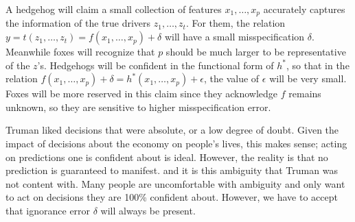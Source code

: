 \documentclass[12pt]{article}
\begin{document}


\begin{enumerate}


A hedgehog will claim a small collection of features $x_1,\ldots,x_p$ accurately captures
the information of the true drivers $z_1,\ldots,z_t$. For them, the relation
$y=t(z_1,\ldots,z_t)=f(x_1,\ldots,x_p)+\delta$ will have a small misspecification $\delta$.
Meanwhile foxes will recognize that $p$ should be much larger to be representative of
the $z$'s. Hedgehogs will be confident in the functional form of $h^*$, so that
in the relation $f(x_1,\ldots,x_p)+\delta=h^*(x_1,\ldots,x_p)+\epsilon$, the value
of $\epsilon$ will be very small. Foxes will be more reserved in this claim since
they acknowledge $f$ remains unknown, so they are sensitive to higher misspecification error.


Truman liked decisions that were absolute, or a low degree of doubt. Given the impact
of decisions about the economy on people's lives, this makes sense; acting on predictions
one is confident about is ideal. However, the reality is that no prediction is guaranteed
to manifest. and it is this ambiguity that Truman was not content with. Many people
are uncomfortable with ambiguity and only want to act on decisions they are 100\% confident
about. However, we have to accept that ignorance error $\delta$ will always be present.




\end{enumerate}
\end{document}
